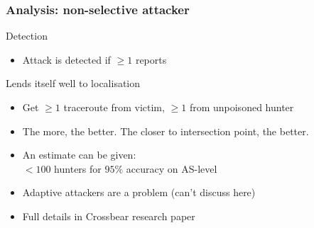\begin{frame}
\frametitle{Analysis: non-selective attacker}
\begin{block}{Detection}
  \begin{itemize}
    \item Attack is detected if $\geq 1$ reports
  \end{itemize}
\end{block}
\begin{block}{Lends itself well to localisation}
  \begin{itemize}
    \item Get $\geq 1$ traceroute from victim,  $\geq 1$ from unpoisoned hunter 
    \item The more, the better. The closer to intersection point, the better.
    \item An estimate can be given: \\ $<100$ hunters for $95\%$ accuracy on AS-level
    \item Adaptive attackers are a problem (can't discuss here)
    \item Full details in Crossbear research paper
  \end{itemize}
\end{block}
\end{frame}




